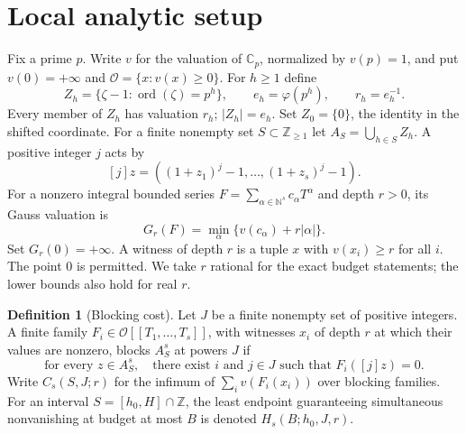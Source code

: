 \documentclass[11pt]{article}
\theoremstyle{definition}
\newtheorem{definition}[theorem]{Definition}
\newcommand{\Cp}{\mathbb C_p}
\newcommand{\OO}{\mathcal O}
\newcommand{\Z}{\mathbb Z}
\newcommand{\N}{\mathbb N}
\newcommand{\ord}{\operatorname{ord}}
\begin{document}
\section{Local analytic setup}\label{sec:setup}

Fix a prime $p$. Write $v$ for the valuation of $\Cp$, normalized by $v(p)=1$, and put $v(0)=+\infty$ and $\OO=\{x:v(x)\ge0\}$. For $h\ge1$ define
\[
 Z_h=\{\zeta-1:\ord(\zeta)=p^h\},\qquad
 e_h=\varphi(p^h),\qquad r_h=e_h^{-1}.
\]
Every member of $Z_h$ has valuation $r_h$; $|Z_h|=e_h$. Set $Z_0=\{0\}$, the identity in the shifted coordinate. For a finite nonempty set $S\subset\Z_{\ge1}$ let $A_S=\bigcup_{h\in S}Z_h$. A positive integer $j$ acts by
\[
 [j]z=((1+z_1)^j-1,\ldots,(1+z_s)^j-1).
\]
For a nonzero integral bounded series $F=\sum_{\alpha\in\N^s}c_\alpha T^\alpha$ and depth $r>0$, its Gauss valuation is
\begin{equation}\label{eq:gauss}
 G_r(F)=\min_{\alpha}\{v(c_\alpha)+r|\alpha|\}.
\end{equation}
Set $G_r(0)=+\infty$. A witness of depth $r$ is a tuple $x$ with $v(x_i)\ge r$ for all $i$. The point $0$ is permitted. We take $r$ rational for the exact budget statements; the lower bounds also hold for real $r$.

\begin{definition}[Blocking cost]\label{def:cost}
Let $J$ be a finite nonempty set of positive integers. A finite family $F_i\in\OO[[T_1,\dots,T_s]]$, with witnesses $x_i$ of depth $r$ at which their values are nonzero, blocks $A_S^s$ at powers $J$ if
\[
 \text{for every }z\in A_S^s,\quad
 \text{there exist }i\text{ and }j\in J\text{ such that }F_i([j]z)=0.
\]
Write $C_s(S,J;r)$ for the infimum of $\sum_i v(F_i(x_i))$ over blocking families. For an interval $S=[h_0,H]\cap\Z$, the least endpoint guaranteeing simultaneous nonvanishing at budget at most $B$ is denoted $H_s(B;h_0,J,r)$.
\end{definition}
\end{document}

